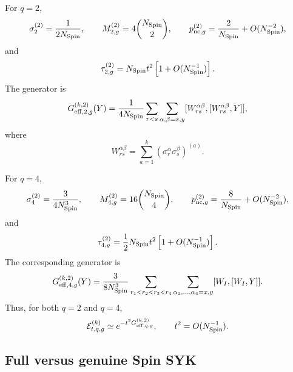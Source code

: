 \documentclass{article}
\theoremstyle{definition}
\begin{document}
For $q=2$,
\begin{equation}
    \sigma_2^{(2)}
    =
    \frac{1}{2N_{\rm Spin}},
    \qquad
    M_{2,g}^{(2)}
    =
    4\binom{N_{\rm Spin}}2,
    \qquad
    p_{{\rm nc},g}^{(2)}
    =
    \frac{2}{N_{\rm Spin}}
    +
    O(N_{\rm Spin}^{-2}),
    \label{eq:BDN_q2_data}
\end{equation}
and
\begin{equation}
    \tau_{2,g}^{(2)}
    =
    N_{\rm Spin}t^2
    \left[
       1+O(N_{\rm Spin}^{-1})
    \right].
    \label{eq:BDN_q2_tau}
\end{equation}
The generator is
\begin{equation}
    G_{{\rm eff},2,g}^{(k,2)}(Y)
    =
    \frac{1}{4N_{\rm Spin}}
    \sum_{r<s}
    \sum_{\alpha,\beta=x,y}
    [W_{rs}^{\alpha\beta},
     [W_{rs}^{\alpha\beta},Y]],
    \label{eq:BDN_q2_Geff}
\end{equation}
where
\begin{equation}
    W_{rs}^{\alpha\beta}
    =
    \sum_{a=1}^k
    (\sigma_r^\alpha\sigma_s^\beta)^{(a)}.
\end{equation}

For $q=4$,
\begin{equation}
    \sigma_4^{(2)}
    =
    \frac{3}{4N_{\rm Spin}^3},
    \qquad
    M_{4,g}^{(2)}
    =
    16\binom{N_{\rm Spin}}4,
    \qquad
    p_{{\rm nc},g}^{(2)}
    =
    \frac{8}{N_{\rm Spin}}
    +
    O(N_{\rm Spin}^{-2}),
    \label{eq:BDN_q4_data}
\end{equation}
and
\begin{equation}
    \tau_{4,g}^{(2)}
    =
    \frac12N_{\rm Spin}t^2
    \left[
       1+O(N_{\rm Spin}^{-1})
    \right].
    \label{eq:BDN_q4_tau}
\end{equation}
The corresponding generator is
\begin{equation}
    G_{{\rm eff},4,g}^{(k,2)}(Y)
    =
    \frac{3}{8N_{\rm Spin}^3}
    \sum_{r_1<r_2<r_3<r_4}
    \sum_{\alpha_1,\ldots,\alpha_4=x,y}
    [W_I,[W_I,Y]].
    \label{eq:BDN_q4_Geff}
\end{equation}
Thus, for both $q=2$ and $q=4$,
\begin{equation}
    {\cal E}_{t,q,g}^{(k)}
    \simeq
    e^{-t^2G_{{\rm eff},q,g}^{(k,2)}},
    \qquad
    t^2=O(N_{\rm Spin}^{-1}).
    \label{eq:BDN_genuine_final}
\end{equation}


\subsection{Full versus genuine Spin SYK}
\label{subsec:full_vs_genuine_spin_syk}
\end{document}
